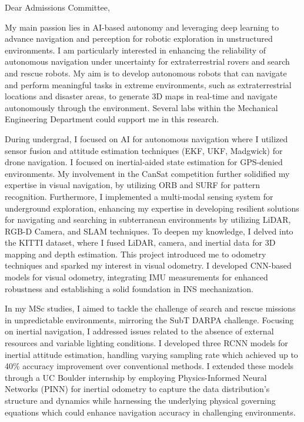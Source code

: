 \documentclass[12pt]{article}
\begin{document}
\justifying

Dear Admissions Committee,

My main passion lies in AI-based autonomy and leveraging deep learning to advance navigation and perception for robotic exploration in unstructured environments. I am particularly interested in enhancing the reliability of autonomous navigation under uncertainty for extraterrestrial rovers and search and rescue robots. My aim is to develop autonomous robots that can navigate and perform meaningful tasks in extreme environments, such as extraterrestrial locations and disaster areas, to generate 3D maps in real-time and navigate autonomously through the environment. Several labs within the Mechanical Engineering Department could support me in this research.



During undergrad, I focused on AI for autonomous navigation where I utilized sensor fusion and attitude estimation techniques (EKF, UKF, Madgwick) for drone navigation. I focused on inertial-aided state estimation for GPS-denied environments. My involvement in the CanSat competition further solidified my expertise in visual navigation, by utilizing ORB and SURF for pattern recognition. Furthermore, I implemented a multi-modal sensing system for underground exploration, enhancing my expertise in developing resilient solutions for navigating and searching in subterranean environments by utilizing LiDAR, RGB-D Camera, and SLAM techniques. To deepen my knowledge, I delved into the KITTI dataset, where I fused LiDAR, camera, and inertial data for 3D mapping and depth estimation. This project introduced me to odometry techniques and sparked my interest in visual odometry. I developed CNN-based models for visual odometry, integrating IMU measurements for enhanced robustness and establishing a solid foundation in INS mechanization.

In my MSc studies, I aimed to tackle the challenge of search and rescue missions in unpredictable environments, mirroring the SubT DARPA challenge. Focusing on inertial navigation, I addressed issues related to the absence of external resources and variable lighting conditions. I developed three RCNN models for inertial attitude estimation, handling varying sampling rate which achieved up to 40\% accuracy improvement over conventional methods. I extended these models through a UC Boulder internship by employing Physics-Informed Neural Networks (PINN) for inertial odometry to capture the data distribution's structure and dynamics while harnessing the underlying physical governing equations which could enhance navigation accuracy in challenging environments. 
\end{document}
